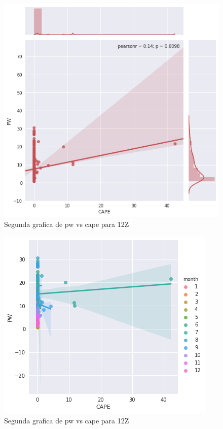 \documentclass{article}
\begin{document}
\begin{figure}[H]
\centering
\includegraphics[scale=0.6]{pvc12z.png}
\caption{Segunda grafica de  pw vs cape para 12Z}
\label{figure: pw vs cape para 12Z}
\end{figure}

\begin{figure}[H]
\centering
\includegraphics[scale=0.59]{pvc212z.png}
\caption{Segunda grafica de  pw vs cape para 12Z}
\label{figure: pw vs cape para 12Z}
\end{figure}
\end{document}
